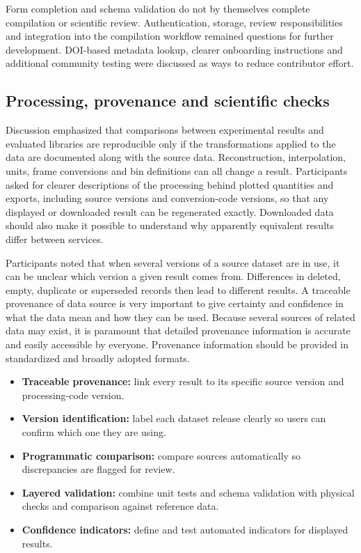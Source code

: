 Form completion and schema validation do not by themselves complete compilation or scientific review. Authentication, storage, review responsibilities and integration into the compilation workflow remained questions for further development. DOI-based metadata lookup, clearer onboarding instructions and additional community testing were discussed as ways to reduce contributor effort.

\subsection{Processing, provenance and scientific checks}
Discussion emphasized that comparisons between experimental results and evaluated libraries are reproducible only if the transformations applied to the data are documented along with the source data. Reconstruction, interpolation, units, frame conversions and bin definitions can all change a result. Participants asked for clearer descriptions of the processing behind plotted quantities and exports, including source versions and conversion-code versions, so that any displayed or downloaded result can be regenerated exactly. Downloaded data should also make it possible to understand why apparently equivalent results differ between services.


Participants noted that when several versions of a source dataset are in use, it can be unclear which version a given result comes from. Differences in deleted, empty, duplicate or superseded records then lead to different results.
A traceable provenance of data source is very important to give certainty and confidence in what the data mean and how they can be used. Because several sources of related data may exist, it is paramount that detailed provenance information is accurate and easily accessible by everyone. Provenance information should be provided in standardized and broadly adopted formats.

\begin{itemize}
  \item \textbf{Traceable provenance:} link every result to its specific source version and processing-code version.
  \item \textbf{Version identification:} label each dataset release clearly so users can confirm which one they are using.
  \item \textbf{Programmatic comparison:} compare sources automatically so discrepancies are flagged for review.
  \item \textbf{Layered validation:} combine unit tests and schema validation with physical checks and comparison against reference data.
  \item \textbf{Confidence indicators:} define and test automated indicators for displayed results.
\end{itemize}

